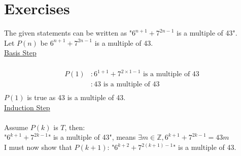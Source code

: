 \documentclass[12pt letter]{report}
\begin{document}
\chapter{Exercises}


\begin{myproof}
  The given statements can be written as "$6^{n + 1} + 7^{2n - 1}$ is a multiple of 43".\\
  Let $P \left( n \right) $ be $6^{n+ 1} + 7^{2n - 1}$ is a multiple of 43. \\

  \noindent \underline{Basis Step} \\
  \\
  \begin{align*}
    P \left( 1 \right) & : 6^{1 + 1} + 7^{2 \times 1 - 1} \text{ is a multiple of } 43 \\
                       & : 43 \text{ is a multiple of } 43                             \\
  \end{align*}
  $P \left( 1 \right) $ is true as 43 is a multiple of 43. \\

  \noindent \underline{Induction  Step} \\
  \\
  Assume $P \left( k \right) $ is $T$, then: \\

  "$6^{k + 1} + 7^{2k - 1}$" is a multiple of 43", means $\exists m \in \mathbb{Z}, 6^{k + 1} + 7^{2k - 1} = 43m$ \\

  \noindent I must now show that $P \left( k + 1 \right) $:
  "$6^{k + 2} + 7^{2 \left( k + 1 \right)  - 1}$" is a multiple of 43.\\


\end{myproof}
\end{document}
